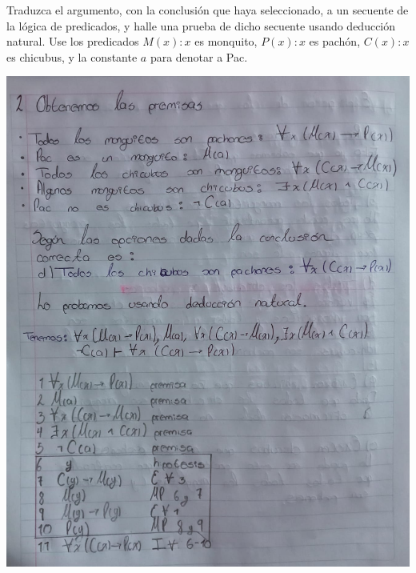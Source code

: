 \documentclass[12pt,letterpaper]{article}
\begin{document}
\begin{enumerate}
  \vspace{0.2cm}
  
  Traduzca el argumento, con la conclusión que haya seleccionado, a un secuente de la lógica de predicados, y halle una prueba de dicho secuente usando deducción natural. Use los predicados $M(x) : x$ es monquito, $P(x) : x$ es pachón, $C(x) : x$ es chicubus, y la constante $a$ para denotar a Pac.
  \bigskip

  \newpage

  \begin{center}
    \hspace{-1.2cm} \includegraphics[width=\textwidth,height=1.0\textheight,keepaspectratio]{ejercicio2a.png}
  \end{center}


\end{enumerate}
\end{document}
